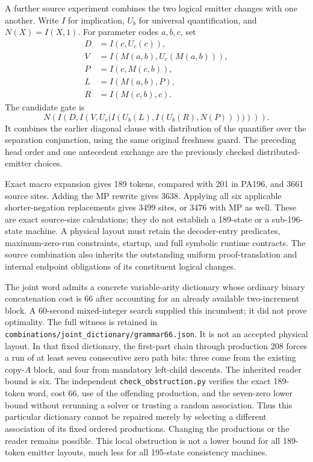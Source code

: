 A further source experiment combines the two logical emitter changes
with one another. Write $I$ for implication, $U_b$ for universal
quantification, and $N(X)=I(X,1)$. For parameter codes $a,b,c$, set
\[
\begin{split}
 D&=I(c,U_c(c)),\\
 V&=I(M(a,b),U_c(M(a,b))),\\
 P&=I(c,M(c,b)),\\
 L&=I(M(a,b),P),\\
 R&=I(M(c,b),c).
\end{split}
\]
The candidate gate is
\[
 N\!\left(I\!\left(D,
 I\!\left(V,U_c\bigl(I(U_b(L),I(U_b(R),N(P)))\bigr)\right)\right)\right).
\]
It combines the earlier diagonal clause with distribution of the
quantifier over the separation conjunction, using the same original
freshness guard. The preceding head order and one antecedent exchange
are the previously checked distributed-emitter choices.

Exact macro expansion gives 189 tokens, compared with 201 in PA196,
and 3661 source sites. Adding the MP rewrite gives 3638. Applying all
six applicable shorter-negation replacements gives 3499 sites, or 3476
with MP as well. These are exact source-size calculations; they do not
establish a 189-state or a sub-196-state machine. A physical layout must
retain the decoder-entry predicates, maximum-zero-run constraints,
startup, and full symbolic runtime contracts. The source combination
also inherits the outstanding uniform proof-translation and internal
endpoint obligations of its constituent logical changes.

The joint word admits a concrete variable-arity dictionary whose ordinary
binary concatenation cost is 66 after accounting for an already available
two-increment block. A 60-second mixed-integer search supplied this
incumbent; it did not prove optimality. The full witness is retained in
\texttt{combinations/joint\_dictionary/grammar66.json}.
It is not an accepted physical layout. In that fixed dictionary, the
first-part chain through production 208 forces a run of at least seven
consecutive zero path bits: three come from the existing copy-$A$ block,
and four from mandatory left-child descents. The inherited reader bound
is six. The independent \texttt{check\_obstruction.py} verifies the exact
189-token word, cost 66, use of the offending production, and the
seven-zero lower bound without rerunning a solver or trusting a random
association. Thus this particular dictionary cannot be repaired merely
by selecting a different association of its fixed ordered productions.
Changing the productions or the reader remains possible. This local
obstruction is not a lower bound for all 189-token emitter layouts, much
less for all 195-state consistency machines.
